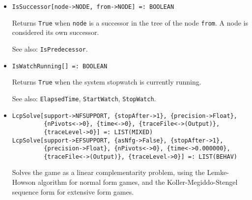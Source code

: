 \begin{itemize}
\item{}
\protect \large \begin{verbatim}
IsSuccessor[node->NODE, from->NODE] =: BOOLEAN 
\end{verbatim}\normalsize

\bd
Returns \verb+True+ when \verb+node+ is a successor
in the tree of the node \verb+from+.  A node is considered its own successor.
\item [See also:] \verb+IsPredecessor+.
\ed

\item{}
\protect \large \begin{verbatim}
IsWatchRunning[] =: BOOLEAN 
\end{verbatim}\normalsize

\bd
Returns \verb+True+ when the system stopwatch is currently running.
\item
[See also:] \verb+ElapsedTime+, \verb+StartWatch+, \verb+StopWatch+.
\ed





\item{}
\protect \large \begin{verbatim}
LcpSolve[support->NFSUPPORT, {stopAfter->1}, {precision->Float}, 
         {nPivots<->0}, {time<->0}, {traceFile<->(Output)}, 
         {traceLevel->0}] =: LIST(MIXED) 
LcpSolve[support->EFSUPPORT, {asNfg->False}, {stopAfter->1}, 
         {precision->Float}, {nPivots<->0}, {time<->0.000000}, 
         {traceFile<->(Output)}, {traceLevel->0}] =: LIST(BEHAV) 
\end{verbatim}\normalsize

\bd
Solves the game as a linear complementarity problem, using the
Lemke-Howson algorithm for normal form games, and the
Koller-Megiddo-Stengel sequence form for extensive form games.  



\end{itemize}
